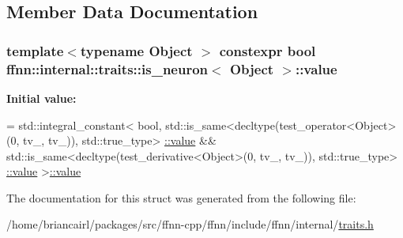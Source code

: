 \subsection{Member Data Documentation}
\hypertarget{structffnn_1_1internal_1_1traits_1_1is__neuron_a672d6bd8da5e49790bfa7ce7f6bf795e}{
\subsubsection[{value}]{\setlength{\rightskip}{0pt plus 5cm}template$<$typename Object $>$ constexpr bool {\bf ffnn\-::internal\-::traits\-::is\-\_\-neuron}$<$ Object $>$\-::value\hspace{0.3cm}{\ttfamily [static]}}}\label{structffnn_1_1internal_1_1traits_1_1is__neuron_a672d6bd8da5e49790bfa7ce7f6bf795e}
{\bfseries Initial value\-:}
\begin{DoxyCode}
=
    std::integral\_constant<
      bool,
      std::is\_same<decltype(test\_operator<Object>(0, tv\_, tv\_)), std::true\_type>
      \hyperlink{structffnn_1_1internal_1_1traits_1_1is__neuron_a672d6bd8da5e49790bfa7ce7f6bf795e}{::value} &&
      std::is\_same<decltype(test\_derivative<Object>(0, tv\_, tv\_)), std::true\_type>
      \hyperlink{structffnn_1_1internal_1_1traits_1_1is__neuron_a672d6bd8da5e49790bfa7ce7f6bf795e}{::value}
    >\hyperlink{structffnn_1_1internal_1_1traits_1_1is__neuron_a672d6bd8da5e49790bfa7ce7f6bf795e}{::value}
\end{DoxyCode}


The documentation for this struct was generated from the following file\-:\begin{DoxyCompactItemize}
\item 
/home/briancairl/packages/src/ffnn-\/cpp/ffnn/include/ffnn/internal/\hyperlink{traits_8h}{traits.\-h}\end{DoxyCompactItemize}
